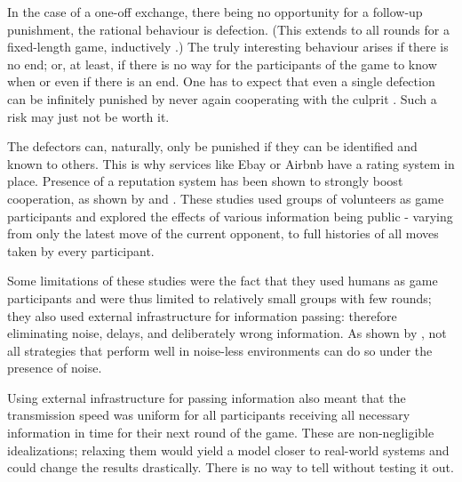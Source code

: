 \documentclass[english]{article}
\begin{document}
In the case of a one-off exchange, there being no opportunity for a follow-up punishment, the rational behaviour is defection. (This extends to all rounds for a fixed-length game, inductively \citep{Axelrod84}.)
The truly interesting behaviour arises if there is no end; or, at least, if there is no way for the participants of the game to know when or even if there is an end.
One has to expect that even a single defection can be infinitely punished by never again cooperating with the culprit \citep{GRIM}.
Such a risk may just not be worth it.

The defectors can, naturally, only be punished if they can be identified and known to others. This is why services like Ebay or Airbnb have a rating system in place.
Presence of a reputation system has been shown to strongly boost cooperation, as shown by \citet{simple-reputation} and \citet{public-private-monitoring}.
These studies used groups of volunteers as game participants and explored the effects of various information being public - varying from only the latest move of the current opponent, to full histories of all moves taken by every participant.

Some limitations of these studies were the fact that they used humans as game participants and were thus limited to relatively small groups with few rounds; they also used external infrastructure for information passing: therefore eliminating noise, delays, and deliberately wrong information.
As shown by \citet{noise}, not all strategies that perform well in noise-less environments can do so under the presence of noise.

Using external infrastructure for passing information also meant that the transmission speed was uniform for all participants receiving all necessary information in time for their next round of the game.
These are non-negligible idealizations; relaxing them would yield a model closer to real-world systems and could change the results drastically.
There is no way to tell without testing it out.
\end{document}
